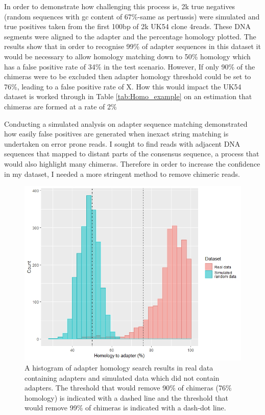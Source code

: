 \documentclass{article}
\begin{document}
In order to demonstrate how challenging this process is, 2k true negatives (random sequences with gc content of 67\%-same as pertussis) were simulated and true positives taken from the first 100bp of 2k UK54 clone 4reads. These DNA segments were aligned to the adapter and the percentage homology plotted. The results show that in order to recognise 99\% of adapter sequences in this dataset it would be necessary to allow homology matching down to 50\% homology which has a false positive rate of 34\% in the test scenario. However, If only 90\% of the chimeras were to be excluded then adapter homology threshold could be set to 76\%, leading to a false positive rate of X. How this would impact the UK54 dataset is worked through in Table \ref{tab:Homo_example} on an estimation that chimeras are formed at a rate of 2\%

Conducting a simulated analysis on adapter sequence matching demonstrated how easily false positives are generated when inexact string matching is undertaken on error prone reads. I sought to find reads with adjacent DNA sequences that mapped to distant parts of the consensus sequence, a process that would also highlight many chimeras. Therefore in order to increase the confidence in my dataset, I needed a more stringent method to remove chimeric reads. 
 


\begin{figure}[h!]
\centering
\includegraphics[width=\textwidth{}]{Chapter_2/Rplot01.jpeg}
\caption{A histogram of adapter homology search results in real data containing adapters and simulated data which did not contain adapters. The threshold that would remove 90\% of chimeras (76\% homology) is indicated with a dashed line and the threshold that would remove 99\% of chimeras is indicated with a dash-dot line. }
\label{fig:Histo_homo}
\end{figure}
\end{document}
